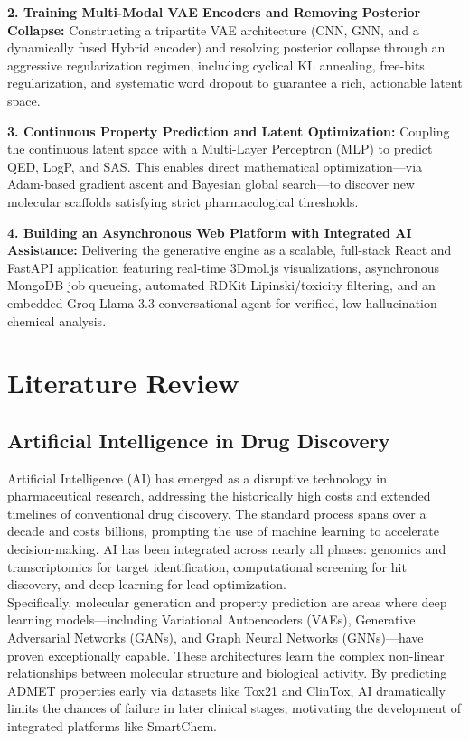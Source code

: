 \documentclass[12pt,a4paper]{report}
\begin{document}
\textbf{2. Training Multi-Modal VAE Encoders and Removing Posterior Collapse:} Constructing a tripartite VAE architecture (CNN, GNN, and a dynamically fused Hybrid encoder) and resolving posterior collapse through an aggressive regularization regimen, including cyclical KL annealing, free-bits regularization, and systematic word dropout to guarantee a rich, actionable latent space.

\textbf{3. Continuous Property Prediction and Latent Optimization:} Coupling the continuous latent space with a Multi-Layer Perceptron (MLP) to predict QED, LogP, and SAS. This enables direct mathematical optimization—via Adam-based gradient ascent and Bayesian global search—to discover new molecular scaffolds satisfying strict pharmacological thresholds.

\textbf{4. Building an Asynchronous Web Platform with Integrated AI Assistance:} Delivering the generative engine as a scalable, full-stack React and FastAPI application featuring real-time 3Dmol.js visualizations, asynchronous MongoDB job queueing, automated RDKit Lipinski/toxicity filtering, and an embedded Groq Llama-3.3 conversational agent for verified, low-hallucination chemical analysis.

\chapter{Literature Review}

\section{Artificial Intelligence in Drug Discovery}

Artificial Intelligence (AI) has emerged as a disruptive technology in pharmaceutical research, addressing the historically high costs and extended timelines of conventional drug discovery. The standard process spans over a decade and costs billions, prompting the use of machine learning to accelerate decision-making. AI has been integrated across nearly all phases: genomics and transcriptomics for target identification, computational screening for hit discovery, and deep learning for lead optimization.\\

Specifically, molecular generation and property prediction are areas where deep learning models—including Variational Autoencoders (VAEs), Generative Adversarial Networks (GANs), and Graph Neural Networks (GNNs)—have proven exceptionally capable. These architectures learn the complex non-linear relationships between molecular structure and biological activity. By predicting ADMET properties early via datasets like Tox21 and ClinTox, AI dramatically limits the chances of failure in later clinical stages, motivating the development of integrated platforms like SmartChem.
\end{document}
